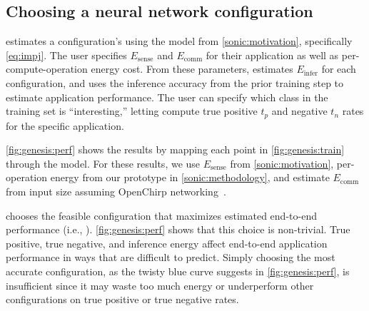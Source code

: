 \tableGenesisNNS

\subsection{Choosing a neural network configuration}

\genesis estimates a configuration's \metric using the model
from \autoref{sonic:motivation}, specifically \autoref{eq:impj}.
%
The user specifies $E_\text{sense}$ and $E_\text{comm}$ for their
application as well as per-compute-operation energy cost.
%
From these parameters, \genesis estimates $E_\text{infer}$ for each
configuration, and uses the inference accuracy from the prior training step to
estimate application performance.
%
The user can specify which class in the training set is
``interesting,'' letting \genesis compute true positive $t_p$ and negative $t_n$ rates for the
specific application.

\autoref{fig:genesis:perf} shows the results by mapping each point in
\autoref{fig:genesis:train} through the model.
%
For these results, we use $E_\text{sense}$ from
\autoref{sonic:motivation}, per-operation energy from our \sonictails
prototype in \autoref{sonic:methodology}, and estimate $E_\text{comm}$
from input size assuming OpenChirp networking~\cite{dongare2017openchirp}.

\genesis chooses the feasible configuration that maximizes
estimated end-to-end performance (i.e., \metric).
%
\autoref{fig:genesis:perf} shows that this choice is non-trivial.
%
True positive, true negative, and inference energy affect end-to-end application
performance in ways that are difficult to predict. Simply choosing the most accurate
configuration, as the twisty blue curve suggests in \autoref{fig:genesis:perf}, 
is insufficient since it may waste too much energy or underperform other 
configurations on true positive or true negative rates.
